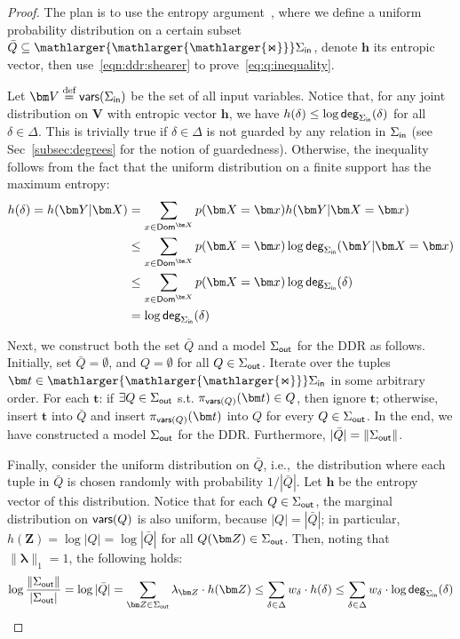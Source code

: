 \documentclass[10pt,a4paper]{article}
\newcommand{\norm}[1]{\|#1\|}
\newcommand{\dom}{\textsf{Dom}}
\newcommand{\degree}{\text{\sf deg}}
\newcommand{\defeq}{\stackrel{\text{def}}{=}}
\newcommand{\bigjoin}{\mathlarger{\mathlarger{\mathlarger{\Join}}}}
\newcommand{\inn}{\text{\sf in}}
\newcommand{\out}{\text{\sf out}}
\newcommand{\vars}{\text{\sf vars}}
\begin{document}
\begin{proof} The plan is to use the entropy argument~\cite{MR859293},
  where we define a uniform probability distribution on a certain subset $\bar Q \subseteq
  \bigjoin \Sigma_{\inn}$, denote $\bm h$ its entropic vector, then
  use~\eqref{eqn:ddr:shearer} to prove~\eqref{eq:q:inequality}.

  Let $\bm V \defeq \vars(\Sigma_{\inn})$ be the set of all input variables. Notice that,
  for any joint distribution on $\bm V$ with entropic vector $\bm h$, we have $h(\delta)
  \leq \log \degree_{\Sigma_{\inn}}(\delta)$ for all $\delta \in \Delta$. This is trivially
  true if $\delta \in \Delta$ is not guarded
  by any relation in $\Sigma_{\inn}$
  (see Sec~\ref{subsec:degrees} for the notion of guardedness).
  Otherwise, the inequality follows from the fact that the uniform
  distribution on a finite support has the maximum entropy:
  \begin{align*}
    h(\delta) = h(\bm Y | \bm X) &=
    \sum_{x \in \dom^{\bm X}} p(\bm X = \bm x) h(\bm Y | \bm X = \bm x)\\
    &\leq
    \sum_{x \in \dom^{\bm X}} p(\bm X = \bm x) \log \degree_{\Sigma_{\inn}}(\bm Y | \bm X = \bm x)\\
    &\leq
    \sum_{x \in \dom^{\bm X}} p(\bm X = \bm x) \log \degree_{\Sigma_{\inn}}(\delta)\\
    &= \log \degree_{\Sigma_{\inn}}(\delta)
  \end{align*}


  Next, we construct both the set $\bar Q$ and a model $\Sigma_{\out}$ for the DDR as follows.
  Initially, set $\bar Q = \emptyset$, and $Q = \emptyset$ for all $Q \in \Sigma_{\out}$.
  Iterate over the tuples $\bm t \in \bigjoin \Sigma_{\inn}$ in some arbitrary order. For
  each $\bm t$: if $\exists Q \in \Sigma_{\out}$ s.t. $\pi_{\vars(Q)}(\bm t) \in Q$, then
  ignore $\bm t$; otherwise,
  insert $\bm t$ into $\bar Q$ and
  insert $\pi_{\vars(Q)}(\bm t)$ into $Q$ for every $Q \in \Sigma_{\out}$.
  In the end, we have constructed a model
  $\Sigma_{\out}$ for the DDR.
  Furthermore, $|\bar Q| = \norm{\Sigma_{\out}}$.

  Finally, consider the uniform distribution on $\bar Q$, i.e.,~the distribution where each
  tuple in $\bar Q$ is chosen randomly with probability $1/|\bar Q|$. Let $\bm h$ be the entropy
  vector of this distribution. Notice that for each $Q \in \Sigma_{\out}$, the marginal
  distribution on $\vars(Q)$ is also uniform, because $|Q| = |\bar Q|$; in particular, $h(\bm
  Z) = \log |Q| = \log |\bar Q|$ for all $Q(\bm Z) \in \Sigma_{\out}$. Then,
  noting that $\norm{\bm \lambda}_1=1$, the following holds:
  \begin{align*}
    \log \frac{\norm{\Sigma_{\out}}}{|\Sigma_\out|} = \log |\bar Q|
    = \sum_{\bm Z\in \Sigma_{\out}} \lambda_{\bm Z} \cdot h(\bm Z) \leq \sum_{\delta \in \Delta} w_\delta\cdot  h(\delta)
        \leq \sum_{\delta \in \Delta} w_\delta \cdot \log \degree_{\Sigma_{\inn}}(\delta) 
  \end{align*}
\end{proof}
\end{document}
